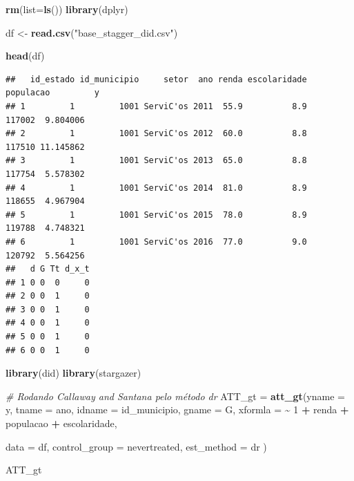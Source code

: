 \documentclass[
]{article}
\author{}
\date{\vspace{-2.5em}}
\newenvironment{Shaded}{\begin{snugshade}}{\end{snugshade}}
\newcommand{\AttributeTok}[1]{\textcolor[rgb]{0.13,0.29,0.53}{#1}}
\newcommand{\CommentTok}[1]{\textcolor[rgb]{0.56,0.35,0.01}{\textit{#1}}}
\newcommand{\DecValTok}[1]{\textcolor[rgb]{0.00,0.00,0.81}{#1}}
\newcommand{\FunctionTok}[1]{\textcolor[rgb]{0.13,0.29,0.53}{\textbf{#1}}}
\newcommand{\NormalTok}[1]{#1}
\newcommand{\OtherTok}[1]{\textcolor[rgb]{0.56,0.35,0.01}{#1}}
\newcommand{\SpecialCharTok}[1]{\textcolor[rgb]{0.81,0.36,0.00}{\textbf{#1}}}
\newcommand{\StringTok}[1]{\textcolor[rgb]{0.31,0.60,0.02}{#1}}
\begin{document}
\begin{Shaded}
\begin{Highlighting}[]
\FunctionTok{rm}\NormalTok{(}\AttributeTok{list=}\FunctionTok{ls}\NormalTok{())}
\FunctionTok{library}\NormalTok{(dplyr)}

\NormalTok{df }\OtherTok{\textless{}{-}} \FunctionTok{read.csv}\NormalTok{(}\StringTok{"base\_stagger\_did.csv"}\NormalTok{)}

\FunctionTok{head}\NormalTok{(df)}
\end{Highlighting}
\end{Shaded}

\begin{verbatim}
##   id_estado id_municipio     setor  ano renda escolaridade populacao         y
## 1         1         1001 ServiC'os 2011  55.9          8.9    117002  9.804006
## 2         1         1001 ServiC'os 2012  60.0          8.8    117510 11.145862
## 3         1         1001 ServiC'os 2013  65.0          8.8    117754  5.578302
## 4         1         1001 ServiC'os 2014  81.0          8.9    118655  4.967904
## 5         1         1001 ServiC'os 2015  78.0          8.9    119788  4.748321
## 6         1         1001 ServiC'os 2016  77.0          9.0    120792  5.564256
##   d G Tt d_x_t
## 1 0 0  0     0
## 2 0 0  1     0
## 3 0 0  1     0
## 4 0 0  1     0
## 5 0 0  1     0
## 6 0 0  1     0
\end{verbatim}

\begin{Shaded}
\begin{Highlighting}[]
\FunctionTok{library}\NormalTok{(did)}
\FunctionTok{library}\NormalTok{(stargazer)}

\CommentTok{\# Rodando Callaway and Sant\textquotesingle{}ana pelo método \textquotesingle{}dr\textquotesingle{}}
\NormalTok{ATT\_gt }\OtherTok{=} \FunctionTok{att\_gt}\NormalTok{(}\AttributeTok{yname =} \StringTok{\textquotesingle{}y\textquotesingle{}}\NormalTok{, }
                \AttributeTok{tname =} \StringTok{\textquotesingle{}ano\textquotesingle{}}\NormalTok{, }
                \AttributeTok{idname =} \StringTok{\textquotesingle{}id\_municipio\textquotesingle{}}\NormalTok{, }
                \AttributeTok{gname =} \StringTok{\textquotesingle{}G\textquotesingle{}}\NormalTok{, }
                \AttributeTok{xformla =} \SpecialCharTok{\textasciitilde{}} \DecValTok{1} \SpecialCharTok{+}\NormalTok{ renda }\SpecialCharTok{+}\NormalTok{ populacao }\SpecialCharTok{+}\NormalTok{ escolaridade,}
                
                \AttributeTok{data =}\NormalTok{ df, }
                \AttributeTok{control\_group =} \StringTok{\textquotesingle{}nevertreated\textquotesingle{}}\NormalTok{, }
                \AttributeTok{est\_method =} \StringTok{\textquotesingle{}dr\textquotesingle{}}
\NormalTok{                )}

\NormalTok{ATT\_gt}
\end{Highlighting}
\end{Shaded}
\end{document}
